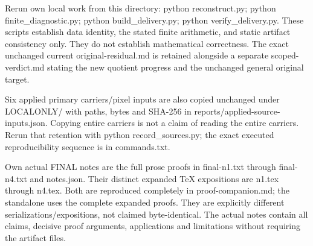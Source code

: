 \documentclass[11pt]{article}
\begin{document}
\begin{RetainedDATA}
Rerun own local work from this directory: python reconstruct.py; python finite_diagnostic.py; python build_delivery.py; python verify_delivery.py. These scripts establish data identity, the stated finite arithmetic, and static artifact consistency only. They do not establish mathematical correctness. The exact unchanged current original-residual.md is retained alongside a separate scoped-verdict.md stating the new quotient progress and the unchanged general original target.

Six applied primary carriers/pixel inputs are also copied unchanged under LOCALONLY/ with paths, bytes and SHA-256 in reports/applied-source-inputs.json. Copying entire carriers is not a claim of reading the entire carriers. Rerun that retention with python record_sources.py; the exact executed reproducibility sequence is in commands.txt.

Own actual FINAL notes are the full prose proofs in final-n1.txt through final-n4.txt and notes.json. Their distinct expanded TeX expositions are n1.tex through n4.tex. Both are reproduced completely in proof-companion.md; the standalone uses the complete expanded proofs. They are explicitly different serializations/expositions, not claimed byte-identical. The actual notes contain all claims, decisive proof arguments, applications and limitations without requiring the artifact files.

\end{RetainedDATA}
\end{document}
